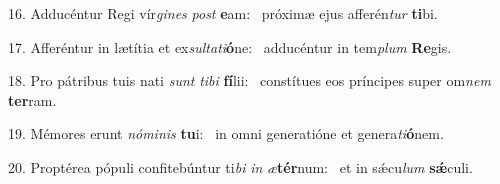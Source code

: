 16. Adducéntur Regi vír\textit{gi}\textit{nes} \textit{post} \textbf{e}am: \ast\  próximæ ejus afferén\textit{tur} \textbf{ti}bi.\

17. Afferéntur in lætítia et ex\textit{sul}\textit{ta}\textit{ti}\textbf{ó}ne: \ast\  adducéntur in tem\textit{plum} \textbf{Re}gis.\

18. Pro pátribus tuis nati \textit{sunt} \textit{ti}\textit{bi} \textbf{fí}lii: \ast\  constítues eos príncipes super om\textit{nem} \textbf{ter}ram.\

19. Mémores erunt \textit{nó}\textit{mi}\textit{nis} \textbf{tu}i: \ast\  in omni generatióne et genera\textit{ti}\textbf{ó}nem.\

20. Proptérea pópuli confitebúntur ti\textit{bi} \textit{in} \textit{æ}\textbf{tér}num: \ast\  et in sǽcu\textit{lum} \textbf{sǽ}culi.\

